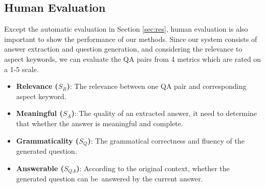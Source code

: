 \subsection{Human Evaluation}
Except the automatic evaluation in Section \ref{sec:res}, human evaluation is also important to show the performance of our methods.
Since our system consists of answer extraction and question generation, 
and considering the relevance to aspect keywords,
we can evaluate the QA pairs from 4 metrics which are rated on a 1-5 scale.
\begin{itemize}
\item \textbf{Relevance ($S_R$)}: The relevance between one QA pair and corresponding aspect keyword.
\item \textbf{Meaningful ($S_A$)}: The quality of an extracted answer, it need to determine that whether the answer is meaningful and complete.
\item \textbf{Grammaticality ($S_Q$)}: The grammatical correctness and fluency of the generated question.
\item \textbf{Answerable ($S_{QA}$)}: According to the original context, whether the generated question can be answered by the current answer.
\end{itemize}

